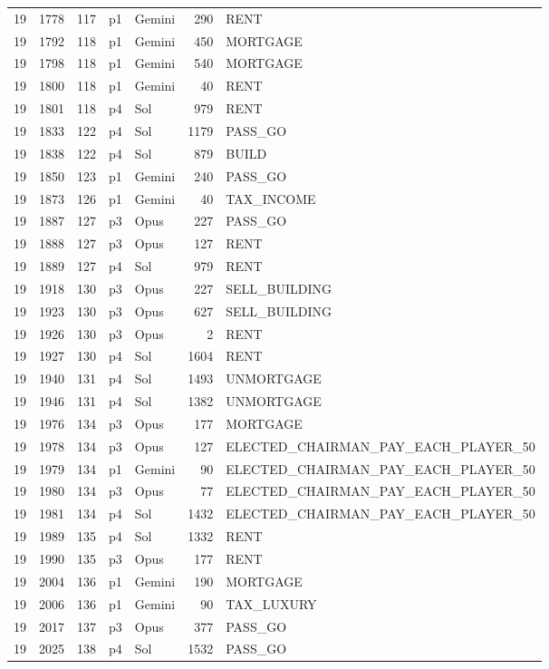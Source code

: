 \begin{longtable}{r r r l l r L{2.2in}}
19 & 1778 & 117 & p1 & Gemini & 290 & RENT \\
19 & 1792 & 118 & p1 & Gemini & 450 & MORTGAGE \\
19 & 1798 & 118 & p1 & Gemini & 540 & MORTGAGE \\
19 & 1800 & 118 & p1 & Gemini & 40 & RENT \\
19 & 1801 & 118 & p4 & Sol & 979 & RENT \\
19 & 1833 & 122 & p4 & Sol & 1179 & PASS\_GO \\
19 & 1838 & 122 & p4 & Sol & 879 & BUILD \\
19 & 1850 & 123 & p1 & Gemini & 240 & PASS\_GO \\
19 & 1873 & 126 & p1 & Gemini & 40 & TAX\_INCOME \\
19 & 1887 & 127 & p3 & Opus & 227 & PASS\_GO \\
19 & 1888 & 127 & p3 & Opus & 127 & RENT \\
19 & 1889 & 127 & p4 & Sol & 979 & RENT \\
19 & 1918 & 130 & p3 & Opus & 227 & SELL\_BUILDING \\
19 & 1923 & 130 & p3 & Opus & 627 & SELL\_BUILDING \\
19 & 1926 & 130 & p3 & Opus & 2 & RENT \\
19 & 1927 & 130 & p4 & Sol & 1604 & RENT \\
19 & 1940 & 131 & p4 & Sol & 1493 & UNMORTGAGE \\
19 & 1946 & 131 & p4 & Sol & 1382 & UNMORTGAGE \\
19 & 1976 & 134 & p3 & Opus & 177 & MORTGAGE \\
19 & 1978 & 134 & p3 & Opus & 127 & ELECTED\_CHAIRMAN\_PAY\_EACH\_PLAYER\_50 \\
19 & 1979 & 134 & p1 & Gemini & 90 & ELECTED\_CHAIRMAN\_PAY\_EACH\_PLAYER\_50 \\
19 & 1980 & 134 & p3 & Opus & 77 & ELECTED\_CHAIRMAN\_PAY\_EACH\_PLAYER\_50 \\
19 & 1981 & 134 & p4 & Sol & 1432 & ELECTED\_CHAIRMAN\_PAY\_EACH\_PLAYER\_50 \\
19 & 1989 & 135 & p4 & Sol & 1332 & RENT \\
19 & 1990 & 135 & p3 & Opus & 177 & RENT \\
19 & 2004 & 136 & p1 & Gemini & 190 & MORTGAGE \\
19 & 2006 & 136 & p1 & Gemini & 90 & TAX\_LUXURY \\
19 & 2017 & 137 & p3 & Opus & 377 & PASS\_GO \\
19 & 2025 & 138 & p4 & Sol & 1532 & PASS\_GO \\

\end{longtable}
